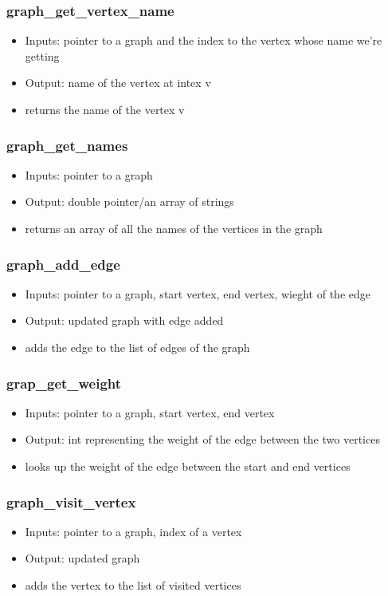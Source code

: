 \documentclass{article}
\begin{document}
\subsubsection{graph\_get\_vertex\_name}
\begin{itemize}
    \item Inputs: pointer to a graph and the index to the vertex whose name we're getting 
    \item Output: name of the vertex at intex v
    \item returns the name of the vertex v 
\end{itemize}
\subsubsection{graph\_get\_names}
\begin{itemize}
    \item Inputs: pointer to a graph 
    \item Output: double pointer/an array of strings 
    \item returns an array of all the names of the vertices in the graph 
\end{itemize}
\subsubsection{graph\_add\_edge}
\begin{itemize}
    \item Inputs: pointer to a graph, start vertex, end vertex, wieght of the edge 
    \item Output: updated graph with edge added
    \item adds the edge to the list of edges of the graph 
\end{itemize}
\subsubsection{grap\_get\_weight}
\begin{itemize}
    \item Inputs: pointer to a graph, start vertex, end vertex 
    \item Output: int representing the weight of the edge between the two vertices
    \item looks up the weight of the edge between the start and end vertices 
\end{itemize}
\subsubsection{graph\_visit\_vertex}
\begin{itemize}
    \item Inputs: pointer to a graph, index of a vertex
    \item Output: updated graph
    \item adds the vertex to the list of visited vertices 
\end{itemize}
\end{document}
